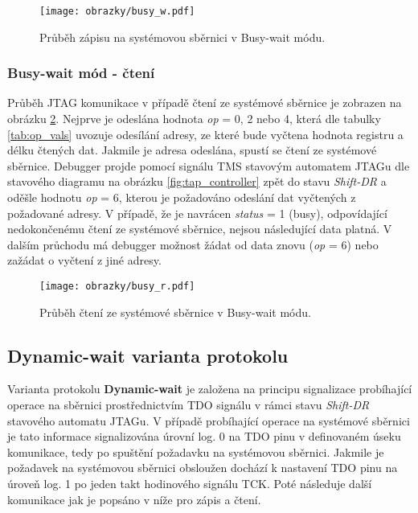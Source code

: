 \begin{figure}[H]
  \begin{center}
    \texttt{[image: obrazky/busy\_w.pdf]}
  \end{center}
  \caption{Průběh zápisu na systémovou sběrnici v Busy-wait módu.}
	\label{fig:busy_w}
\end{figure}

\subsubsection{Busy-wait mód - čtení} 
Průběh JTAG komunikace v případě čtení ze systémové sběrnice je zobrazen na obrázku \ref{fig:busy_r}. Nejprve je odeslána hodnota \textit{op} = 0, 2 nebo 4, která dle tabulky \ref{tab:op_vals} uvozuje odesílání adresy, ze které bude vyčtena hodnota registru a délku čtených dat. Jakmile je adresa odeslána, spustí se čtení ze systémové sběrnice. Debugger projde pomocí signálu \acs{TMS} stavovým automatem JTAGu dle stavového diagramu na obrázku \ref{fig:tap_controller} zpět do stavu \textit{Shift-DR} a oděšle hodnotu \textit{op} = 6, kterou je požadováno odeslání dat vyčtených z požadované adresy. V případě, že je navrácen \textit{status} = 1 (busy), odpovídající nedokončenému čtení ze systémové sběrnice, nejsou následující data platná. V dalším průchodu má debugger možnost žádat od data znovu (\textit{op} = 6) nebo zažádat o vyčtení z jiné adresy.

\begin{figure}[!h]
  \begin{center}
    \texttt{[image: obrazky/busy\_r.pdf]}
  \end{center}
  \caption{Průběh čtení ze systémové sběrnice v Busy-wait módu.}
	\label{fig:busy_r}
\end{figure}

\subsection{Dynamic-wait varianta protokolu}	\label{subsec:dyn-wait}
Varianta protokolu \textbf{Dynamic-wait} je založena na principu signalizace probíhající operace na sběrnici prostřednictvím \acs{TDO} signálu v rámci stavu \textit{Shift-DR} stavového automatu JTAGu. V případě probíhající operace na systémové sběrnici je tato informace signalizována úrovní log. 0 na \acs{TDO} pinu v definovaném úseku komunikace, tedy po spuštění požadavku na systémovou sběrnici. Jakmile je požadavek na systémovou sběrnici obsloužen dochází k nastavení \acs{TDO} pinu na úroveň log. 1 po jeden takt hodinového signálu \acs{TCK}. Poté následuje další komunikace jak je popsáno v níže pro zápis a čtení.

